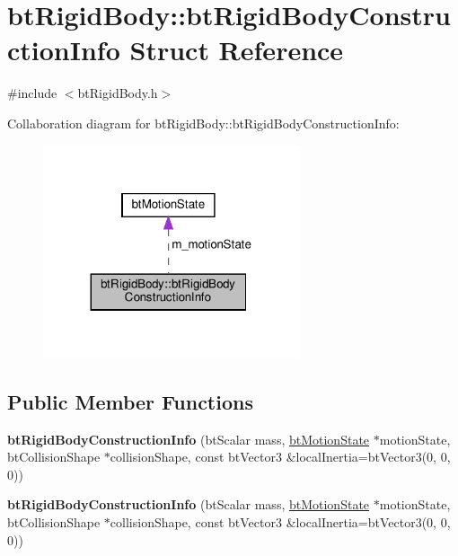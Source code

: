 \hypertarget{structbtRigidBody_1_1btRigidBodyConstructionInfo}{}\section{bt\+Rigid\+Body\+:\+:bt\+Rigid\+Body\+Construction\+Info Struct Reference}
\label{structbtRigidBody_1_1btRigidBodyConstructionInfo}


{\ttfamily \#include $<$bt\+Rigid\+Body.\+h$>$}



Collaboration diagram for bt\+Rigid\+Body\+:\+:bt\+Rigid\+Body\+Construction\+Info\+:
\nopagebreak
\begin{figure}[H]
\begin{center}
\leavevmode
\includegraphics[width=215pt]{structbtRigidBody_1_1btRigidBodyConstructionInfo__coll__graph}
\end{center}
\end{figure}
\subsection*{Public Member Functions}
\begin{DoxyCompactItemize}
\item 
\mbox{\label{structbtRigidBody_1_1btRigidBodyConstructionInfo_a3415546c0299c88261e1951193c073d0}} 
{\bfseries bt\+Rigid\+Body\+Construction\+Info} (bt\+Scalar mass, \hyperlink{classbtMotionState}{bt\+Motion\+State} $\ast$motion\+State, bt\+Collision\+Shape $\ast$collision\+Shape, const bt\+Vector3 \&local\+Inertia=bt\+Vector3(0, 0, 0))
\item 
\mbox{\label{structbtRigidBody_1_1btRigidBodyConstructionInfo_a3415546c0299c88261e1951193c073d0}} 
{\bfseries bt\+Rigid\+Body\+Construction\+Info} (bt\+Scalar mass, \hyperlink{classbtMotionState}{bt\+Motion\+State} $\ast$motion\+State, bt\+Collision\+Shape $\ast$collision\+Shape, const bt\+Vector3 \&local\+Inertia=bt\+Vector3(0, 0, 0))
\end{DoxyCompactItemize}

